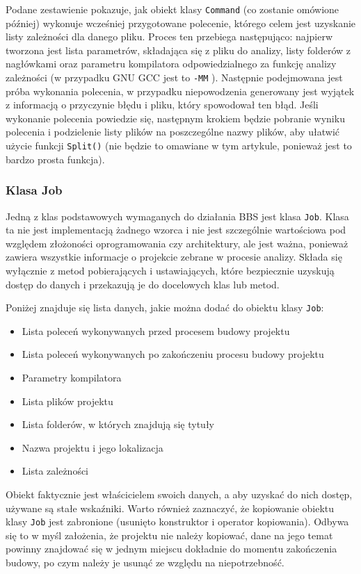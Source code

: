 Podane zestawienie pokazuje, jak obiekt klasy \texttt{Command} (co zostanie omówione później) wykonuje wcześniej przygotowane polecenie, którego celem jest uzyskanie listy zależności dla danego pliku. Proces ten przebiega następująco: najpierw tworzona jest lista parametrów, składająca się z pliku do analizy, listy folderów z nagłówkami oraz parametru kompilatora odpowiedzialnego za funkcję analizy zależności (w przypadku GNU GCC jest to \texttt{-MM} \cite{gcc} ). Następnie podejmowana jest próba wykonania polecenia, w przypadku niepowodzenia generowany jest wyjątek z informacją o przyczynie błędu i pliku, który spowodował ten błąd. Jeśli wykonanie polecenia powiedzie się, następnym krokiem będzie pobranie wyniku polecenia i podzielenie listy plików na poszczególne nazwy plików, aby ułatwić użycie funkcji \texttt{Split()} (nie będzie to omawiane w tym artykule, ponieważ jest to bardzo prosta funkcja).

\subsubsection{Klasa Job}

Jedną z klas podstawowych wymaganych do działania BBS jest klasa \texttt{Job}. Klasa ta nie jest implementacją żadnego wzorca i nie jest szczególnie wartościowa pod względem złożoności oprogramowania czy architektury, ale jest ważna, ponieważ zawiera wszystkie informacje o projekcie zebrane w procesie analizy. Składa się wyłącznie z metod pobierających i ustawiających, które bezpiecznie uzyskują dostęp do danych i przekazują je do docelowych klas lub metod.

Poniżej znajduje się lista danych, jakie można dodać do obiektu klasy \texttt{Job}:
\begin{itemize}
    \item Lista poleceń wykonywanych przed procesem budowy projektu
    \item Lista poleceń wykonywanych po zakończeniu procesu budowy projektu
    \item Parametry kompilatora
    \item Lista plików projektu
    \item Lista folderów, w których znajdują się tytuły
    \item Nazwa projektu i jego lokalizacja
    \item Lista zależności
\end{itemize}

Obiekt faktycznie jest właścicielem swoich danych, a aby uzyskać do nich dostęp, używane są stałe wskaźniki. Warto również zaznaczyć, że kopiowanie obiektu klasy \texttt{Job} jest zabronione (usunięto konstruktor i operator kopiowania). Odbywa się to w myśl założenia, że projektu nie należy kopiować, dane na jego temat powinny znajdować się w jednym miejscu dokładnie do momentu zakończenia budowy, po czym należy je usunąć ze względu na niepotrzebność.

